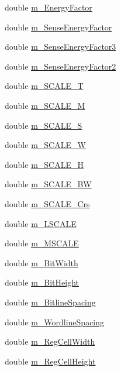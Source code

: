 \begin{DoxyCompactItemize}
\item 
double \hyperlink{classTechParameter_aed705704b7355e84158ff2f6246ee370}{m\_\-EnergyFactor}
\item 
double \hyperlink{classTechParameter_a3f1abe9e38dcceda8ca86213e1e225aa}{m\_\-SenseEnergyFactor}
\item 
double \hyperlink{classTechParameter_a5837432c375303744f2b2e80d5ff81e8}{m\_\-SenseEnergyFactor3}
\item 
double \hyperlink{classTechParameter_a9f03f8cc130792f9b94054d856863701}{m\_\-SenseEnergyFactor2}
\item 
double \hyperlink{classTechParameter_a62710d9f5c685f4d50b876de4c3a3b96}{m\_\-SCALE\_\-T}
\item 
double \hyperlink{classTechParameter_a75d58e6665590be3ac6501cb715b198c}{m\_\-SCALE\_\-M}
\item 
double \hyperlink{classTechParameter_a142819ae7d210f7c112dad00c3132995}{m\_\-SCALE\_\-S}
\item 
double \hyperlink{classTechParameter_ab3c95d7983f4b5af5aaf3e4434692a16}{m\_\-SCALE\_\-W}
\item 
double \hyperlink{classTechParameter_a4f98e917a1d06586511f0a7ad6773558}{m\_\-SCALE\_\-H}
\item 
double \hyperlink{classTechParameter_aef7f64a6c158b7c666d41a74047b91eb}{m\_\-SCALE\_\-BW}
\item 
double \hyperlink{classTechParameter_a2ca231fab5021e642e275daa7f25d06c}{m\_\-SCALE\_\-Crs}
\item 
double \hyperlink{classTechParameter_a9f19990e24952cfe7fa502f14b188b88}{m\_\-LSCALE}
\item 
double \hyperlink{classTechParameter_a5b885affef06f79ab08e1e4ac63f927d}{m\_\-MSCALE}
\item 
double \hyperlink{classTechParameter_a20bec8521948c96151f351bbd34c1fcd}{m\_\-BitWidth}
\item 
double \hyperlink{classTechParameter_af8d451129eb05b2fdfdf4bf10b11c048}{m\_\-BitHeight}
\item 
double \hyperlink{classTechParameter_a0ebd7b8d6c78ad4acdd2efbcac882386}{m\_\-BitlineSpacing}
\item 
double \hyperlink{classTechParameter_a690a8bfed069ed5aff9b4ad878003630}{m\_\-WordlineSpacing}
\item 
double \hyperlink{classTechParameter_a47e1c2444028f59f5ba85f5e268987cf}{m\_\-RegCellWidth}
\item 
double \hyperlink{classTechParameter_a687d3e072960fbea2a43e259fbcbfe86}{m\_\-RegCellHeight}

\end{DoxyCompactItemize}

